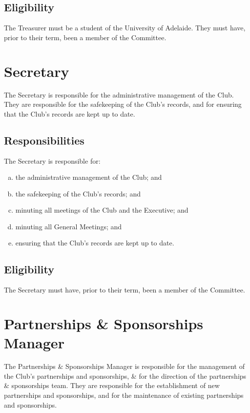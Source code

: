 \documentclass[11pt]{report}
\begin{document}
\subsection{Eligibility}
The Treasurer must be a student of the University of Adelaide. They must have, prior to their term, been a member of the Committee.

\section{Secretary}
The Secretary is responsible for the administrative management of the Club. They are responsible for the safekeeping of the Club's records, and for ensuring that the Club's records are kept up to date.
\subsection{Responsibilities}
The Secretary is responsible for:
\begin{enumerate}[(a)]
    \item the administrative management of the Club; and
    \item the safekeeping of the Club's records; and
    \item minuting all meetings of the Club and the Executive; and
    \item minuting all General Meetings; and
    \item ensuring that the Club's records are kept up to date.
\end{enumerate}
\subsection{Eligibility}
The Secretary must have, prior to their term, been a member of the Committee.

\section{Partnerships \& Sponsorships Manager}
The Partnerships \& Sponsorships Manager is responsible for the management of the Club's partnerships and sponsorships, \& for the direction of the partnerships \& sponsorships team. They are responsible for the establishment of new partnerships and sponsorships, and for the maintenance of existing partnerships and sponsorships.
\end{document}
